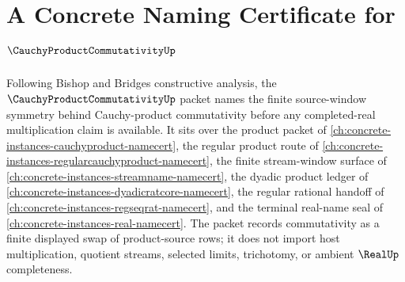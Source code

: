 \chapter{A Concrete Naming Certificate for $\CauchyProductCommutativityUp$}
\label{ch:concrete-instances-cauchy-product-commutativity-namecert}

Following Bishop and Bridges constructive analysis, the $\CauchyProductCommutativityUp$ packet names the finite source-window symmetry behind Cauchy-product commutativity before any completed-real multiplication claim is available. It sits over the product packet of \autoref{ch:concrete-instances-cauchyproduct-namecert}, the regular product route of \autoref{ch:concrete-instances-regularcauchyproduct-namecert}, the finite stream-window surface of \autoref{ch:concrete-instances-streamname-namecert}, the dyadic product ledger of \autoref{ch:concrete-instances-dyadicratcore-namecert}, the regular rational handoff of \autoref{ch:concrete-instances-regseqrat-namecert}, and the terminal real-name seal of \autoref{ch:concrete-instances-real-namecert}. The packet records commutativity as a finite displayed swap of product-source rows; it does not import host multiplication, quotient streams, selected limits, trichotomy, or ambient $\RealUp$ completeness.

